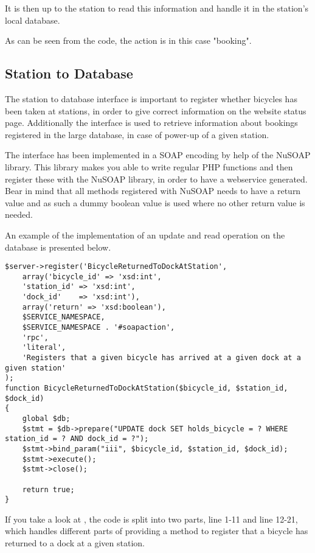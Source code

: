 It is then up to the station to read this information and handle it in the station's local database.

As can be seen from the code, the action is in this case "booking".

\subsection{Station to Database}
The station to database interface is important to register whether bicycles has been taken at stations, in order to give correct information on the website status page.
Additionally the interface is used to retrieve information about bookings registered in the large database, in case of power-up of a given station.

The interface has been implemented in a SOAP encoding by help of the NuSOAP library.
This library makes you able to write regular PHP functions and then register these with the NuSOAP library, in order to have a webservice generated.
Bear in mind that all methods registered with NuSOAP needs to have a return value and as such a dummy boolean value is used where no other return value is needed.

An example of the implementation of an update and read operation on the database is presented below.

\begin{minipage}{\textwidth}
\begin{lstlisting}[caption = {Method for registering a bicycle as been returned to a dock at a given station.}, label = {lst:bicycledockstationreturned}]
$server->register('BicycleReturnedToDockAtStation',
	array('bicycle_id' => 'xsd:int',
	'station_id' => 'xsd:int',
	'dock_id'    => 'xsd:int'),
	array('return' => 'xsd:boolean'),
	$SERVICE_NAMESPACE,
	$SERVICE_NAMESPACE . '#soapaction',
	'rpc',
	'literal',
	'Registers that a given bicycle has arrived at a given dock at a given station'
);
function BicycleReturnedToDockAtStation($bicycle_id, $station_id, $dock_id)
{
	global $db;
	$stmt = $db->prepare("UPDATE dock SET holds_bicycle = ? WHERE station_id = ? AND dock_id = ?");
	$stmt->bind_param("iii", $bicycle_id, $station_id, $dock_id);
	$stmt->execute();
	$stmt->close();
	
	return true;
}
\end{lstlisting}
\end{minipage}

If you take a look at , the code is split into two parts, line 1-11 and line 12-21, which handles different parts of providing a method to register that a bicycle has returned to a dock at a given station.


